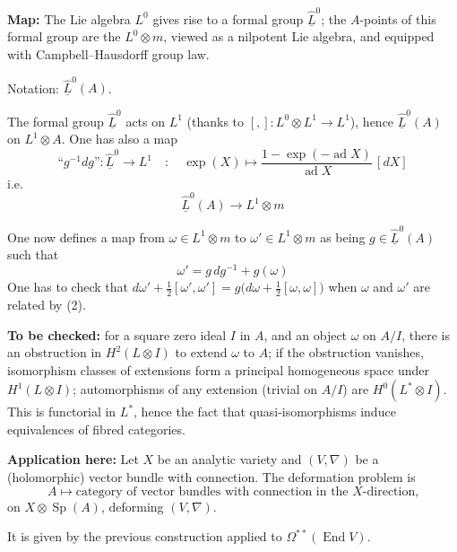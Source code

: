 \documentclass[11pt,a4paper]{article}
\DeclareMathOperator{\End}{End}
\DeclareMathOperator{\Sp}{Sp}
\DeclareMathOperator{\ad}{ad}
\begin{document}
\vspace{0.2cm}

\noindent\textbf{Map:} The Lie algebra $L^0$ gives rise to a formal group $\widehat{\underline{L}}^0$; the $A$-points of this formal group are the $L^0 \otimes m$, viewed as a nilpotent Lie algebra, and equipped with Campbell--Hausdorff group law.

\noindent Notation: $\widehat{\underline{L}}^0(A)$.

\newpage

The formal group $\widehat{\underline{L}}^0$ acts on $L^1$ (thanks to $[,]\colon L^0 \otimes L^1 \to L^1$), hence $\widehat{\underline{L}}^0(A)$ on $L^1 \otimes A$. One has also a map
\[
\text{``}g^{-1}dg\text{''}\colon \widehat{\underline{L}}^0 \longrightarrow L^1 \quad\colon\quad \exp(X) \longmapsto \frac{1-\exp(-\ad X)}{\ad X}\,[dX]
\]
i.e.
\[
\widehat{\underline{L}}^0(A) \longrightarrow L^1 \otimes m
\]

One now defines a map from $\omega \in L^1 \otimes m$ to $\omega' \in L^1 \otimes m$ as being $g \in \widehat{\underline{L}}^0(A)$ such that
\begin{equation}\label{eq:2}
\omega' = g\,dg^{-1} + g(\omega)
\end{equation}
One has to check that $d\omega' + \frac{1}{2}[\omega',\omega'] = g\bigl(d\omega + \frac{1}{2}[\omega,\omega]\bigr)$ when $\omega$ and $\omega'$ are related by (2).

\vspace{0.3cm}

\noindent\textbf{To be checked:} for a square zero ideal $I$ in $A$, and an object $\omega$ on $A/I$, there is an obstruction in $H^2(L \otimes I)$ to extend $\omega$ to $A$; if the obstruction vanishes, isomorphism classes of extensions form a principal homogeneous space under $H^1(L \otimes I)$; automorphisms of any extension (trivial on $A/I$) are $H^0(L^* \otimes I)$. This is functorial in $L^*$, hence the fact that quasi-isomorphisms induce equivalences of fibred categories.

\vspace{0.3cm}

\noindent\textbf{Application here:} Let $X$ be an analytic variety and $(V,\nabla)$ be a (holomorphic) vector bundle with connection. The deformation problem is
\[
A \longmapsto \text{category of vector bundles with connection in the $X$-direction,}
\]
on $X \otimes \Sp(A)$, deforming $(V,\nabla)$.

It is given by the previous construction applied to $\Omega^{**}(\End V)$.
\end{document}
